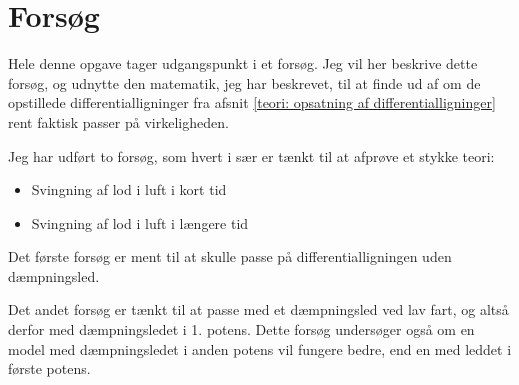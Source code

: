 \chapter{Forsøg}
Hele denne opgave tager udgangspunkt i et forsøg.
Jeg vil her beskrive dette forsøg, og udnytte den matematik, jeg har beskrevet, til at finde ud af om de opstillede differentialligninger fra afsnit \ref{teori: opsatning af differentialligninger} rent faktisk passer på virkeligheden.

Jeg har udført to forsøg, som hvert i sær er tænkt til at afprøve et stykke teori:
\begin{itemize}
	\item Svingning af lod i luft i kort tid
	\item Svingning af lod i luft i længere tid
\end{itemize}

Det første forsøg er ment til at skulle passe på differentialligningen uden dæmpningsled.

Det andet forsøg er tænkt til at passe med et dæmpningsled ved lav fart, og altså derfor med dæmpningsledet i 1. potens.
Dette forsøg undersøger også om en model med dæmpningsledet i anden potens vil fungere bedre, end en med leddet i første potens.  
